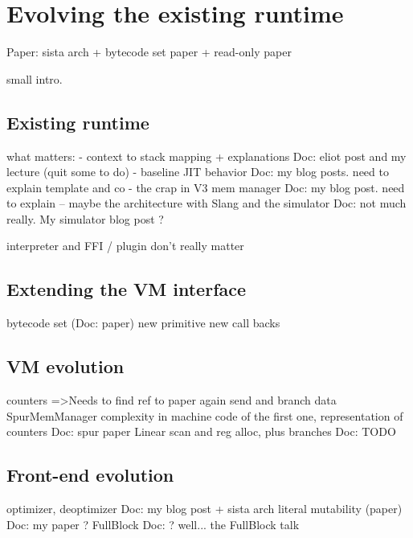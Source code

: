 \documentclass[a4paper,12pt,twoside]{../includes/ThesisStyle}
\begin{document}
\fi

\chapter{Evolving the existing runtime}
\label{chap:archImpl}
\minitoc

Paper: sista arch + bytecode set paper + read-only paper

small intro. 

\section{Existing runtime}

what matters:
- context to stack mapping + explanations
Doc: eliot post and my lecture (quit some to do)
- baseline JIT behavior
Doc: my blog posts. need to explain template and co
- the crap in V3 mem manager
Doc: my blog post. need to explain
-- maybe the architecture with Slang and the simulator
Doc: not much really. My simulator blog post ?

interpreter and FFI / plugin don't really matter

\section{Extending the VM interface}

bytecode set (Doc: paper)
new primitive
new call backs

\section{VM evolution}

counters
=>Needs to find ref to paper again
send and branch data
SpurMemManager complexity in machine code of the first one, representation of counters
Doc: spur paper
Linear scan and reg alloc, plus branches
Doc: TODO

\section{Front-end evolution}

optimizer, deoptimizer 
Doc: my blog post + sista arch
literal mutability (paper)
Doc: my paper ?
FullBlock
Doc: ? well... the FullBlock talk


\ifx\wholebook\relax\else
    
\end{document}
